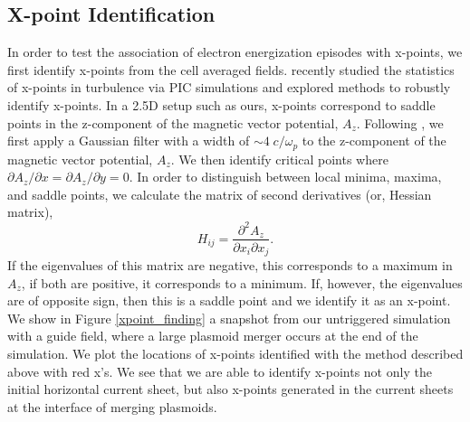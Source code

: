 \documentclass[iop,twocolappendix]{emulateapj}
\begin{document}
\subsection{X-point Identification} \label{xpoint_id}
In order to test the association of electron energization episodes with x-points, we first identify x-points from the cell averaged fields.  \citet{haggerty2017} recently studied the statistics of x-points in turbulence via PIC simulations and explored methods to robustly identify x-points.  In a 2.5D setup such as ours, x-points correspond to saddle points in the z-component of the magnetic vector potential, $A_{z}$.  Following \citet{haggerty2017}, we first apply a Gaussian filter with a width of $\sim 4 \; c/\omega_{p}$ to the z-component of the magnetic vector potential, $A_{z}$.  We then identify critical points where $\partial A_{z}/\partial x=\partial A_{z}/\partial y=0$.  In order to distinguish between local minima, maxima, and saddle points, we calculate the matrix of second derivatives (or, Hessian matrix), 
$$H_{ij}=\frac{\partial^{2} A_{z}}{\partial x_{i} \partial x_{j}}.$$  If the eigenvalues of this matrix are negative, this corresponds to a maximum in $A_{z}$, if both are positive, it corresponds to a minimum.  If, however, the eigenvalues are of opposite sign, then this is a saddle point and we identify it as an x-point.  We show in Figure \ref{xpoint_finding} a snapshot from our untriggered simulation with a guide field, where a large plasmoid merger occurs at the end of the simulation.  We plot the locations of x-points identified with the method described above with red x's.  We see that we are able to identify x-points not only the initial horizontal current sheet, but also x-points generated in the current sheets at the interface of merging plasmoids.
\end{document}
